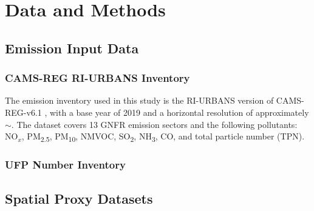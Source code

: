 
\chapter{Data and Methods}
\label{ch:methods}


\section{Emission Input Data}
\label{sec:data_emissions}

\subsection{CAMS-REG RI-URBANS Inventory}
\label{sec:data_cams}

The \cams{} emission inventory used in this study is the RI-URBANS version of
CAMS-REG-v6.1 \citep{Kuenen_ST15_2025}, with a base year of 2019 and a
horizontal resolution of approximately $\sim$. The
dataset covers 13 GNFR emission sectors and the following pollutants: NO$_x$,
PM\textsubscript{2.5}, PM\textsubscript{10}, NMVOC, SO\textsubscript{2},
NH\textsubscript{3}, CO, and total particle number (TPN).


\subsection{UFP Number Inventory}
\label{sec:data_ufp}


\section{Spatial Proxy Datasets}
\label{sec:data_proxies}

